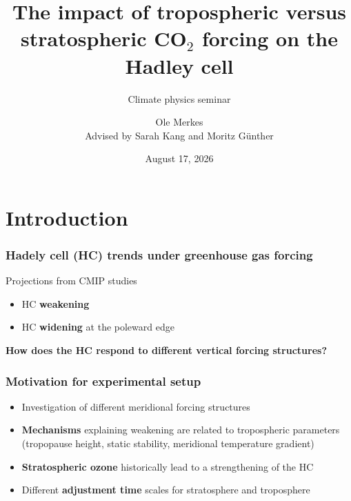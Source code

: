 \documentclass{beamer}
\subtitle{Climate physics seminar}
\title{The impact of tropospheric versus stratospheric CO$_2$ forcing on the Hadley cell }
\author[Ole Merkes]{Ole Merkes \\[1\baselineskip]
Advised by Sarah Kang and Moritz Günther \\
}
\date{August 17, 2026}
\begin{document}
\begin{frame}
    \titlepage
\end{frame}
\section{Introduction}

\begin{frame}
    \frametitle{Hadely cell (HC) trends under greenhouse gas forcing}
    \begin{block}{Projections from CMIP studies}
        \begin{itemize}
            \item HC  \textbf{weakening} \parencite{luExpansionHadleyCell2007, xiaComparisonTrendsHadley2020}
            \item HC \textbf{widening}  at the poleward edge \parencite{luExpansionHadleyCell2007, xiaComparisonTrendsHadley2020}
        \end{itemize}
        \centering
    \end{block}
    \vfill \pause
    \textbf{How does the HC respond to different vertical forcing structures?}
\end{frame}

\begin{frame}
    \frametitle{Motivation for experimental setup}
    \begin{block}{}
        \begin{itemize}[<+->]
            \item Investigation of different meridional forcing structures \parencite{shawTestingLatitudinallyDependent2018,kimWeakHadleyCell2022}
            \item \textbf{Mechanisms} explaining weakening are related to tropospheric parameters (tropopause height, static stability, meridional temperature gradient) \parencite{chemkeElucidatingMechanismsResponsible2021}
            \item \textbf{Stratospheric ozone} historically lead to a strengthening of the HC \parencite{sonImpactStratosphericOzone2010}
            \item Different \textbf{adjustment time} scales for stratosphere and troposphere
        \end{itemize}
    \end{block}

\end{frame}
\end{document}
